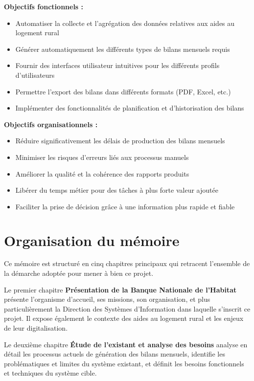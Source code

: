 \textbf{Objectifs fonctionnels :}
\begin{itemize}
    \item Automatiser la collecte et l'agrégation des données relatives aux aides au logement rural
    \item Générer automatiquement les différents types de bilans mensuels requis
    \item Fournir des interfaces utilisateur intuitives pour les différents profils d'utilisateurs
    \item Permettre l'export des bilans dans différents formats (PDF, Excel, etc.)
    \item Implémenter des fonctionnalités de planification et d'historisation des bilans
\end{itemize}

\textbf{Objectifs organisationnels :}
\begin{itemize}
    \item Réduire significativement les délais de production des bilans mensuels
    \item Minimiser les risques d'erreurs liés aux processus manuels
    \item Améliorer la qualité et la cohérence des rapports produits
    \item Libérer du temps métier pour des tâches à plus forte valeur ajoutée
    \item Faciliter la prise de décision grâce à une information plus rapide et fiable
\end{itemize}

\section*{Organisation du mémoire}

Ce mémoire est structuré en cinq chapitres principaux qui retracent l'ensemble de la démarche adoptée pour mener à bien ce projet.

\medskip

Le premier chapitre \og \textbf{Présentation de la Banque Nationale de l'Habitat} \fg présente l'organisme d'accueil, ses missions, son organisation, et plus particulièrement la Direction des Systèmes d'Information dans laquelle s'inscrit ce projet. Il expose également le contexte des aides au logement rural et les enjeux de leur digitalisation.

\medskip

Le deuxième chapitre \og \textbf{Étude de l'existant et analyse des besoins} \fg analyse en détail les processus actuels de génération des bilans mensuels, identifie les problématiques et limites du système existant, et définit les besoins fonctionnels et techniques du système cible.

